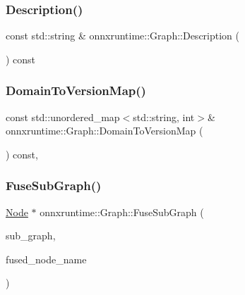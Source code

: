 \mbox{\label{classonnxruntime_1_1Graph_a3cde3be78cc7acab2626b189af64f82f}} 
\subsubsection{\texorpdfstring{Description()}{Description()}}
{\footnotesize\ttfamily const std\+::string \& onnxruntime\+::\+Graph\+::\+Description (\begin{DoxyParamCaption}{ }\end{DoxyParamCaption}) const\hspace{0.3cm}{\ttfamily [noexcept]}}

\mbox{\label{classonnxruntime_1_1Graph_a46d1e58cbb0615f3e9733f15fb7aa1cc}} 
\subsubsection{\texorpdfstring{Domain\+To\+Version\+Map()}{DomainToVersionMap()}}
{\footnotesize\ttfamily const std\+::unordered\+\_\+map$<$std\+::string, int$>$\& onnxruntime\+::\+Graph\+::\+Domain\+To\+Version\+Map (\begin{DoxyParamCaption}{ }\end{DoxyParamCaption}) const\hspace{0.3cm}{\ttfamily [inline]}, {\ttfamily [noexcept]}}

\mbox{\label{classonnxruntime_1_1Graph_a4d09a87a881969281aaca973ec5bebd4}} 
\subsubsection{\texorpdfstring{Fuse\+Sub\+Graph()}{FuseSubGraph()}}
{\footnotesize\ttfamily \mbox{\hyperlink{classonnxruntime_1_1Node}{Node}} $\ast$ onnxruntime\+::\+Graph\+::\+Fuse\+Sub\+Graph (\begin{DoxyParamCaption}\item[{std\+::unique\+\_\+ptr$<$\+::\mbox{\hyperlink{structonnxruntime_1_1IndexedSubGraph}{onnxruntime\+::\+Indexed\+Sub\+Graph}} $>$}]{sub\+\_\+graph,  }\item[{const std\+::string \&}]{fused\+\_\+node\+\_\+name }\end{DoxyParamCaption})}

